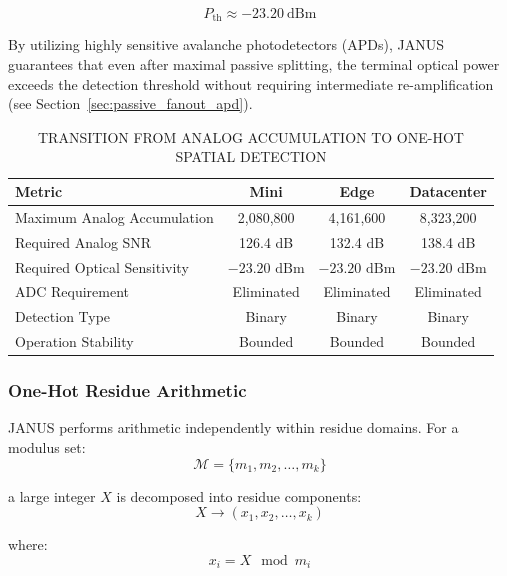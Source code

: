 \documentclass[journal]{IEEEtran}
\begin{document}
\begin{equation}
P_{\mathrm{th}} \approx -23.20~\mathrm{dBm}
\end{equation}

By utilizing highly sensitive avalanche photodetectors (APDs), JANUS guarantees that even after maximal passive splitting, the terminal optical power exceeds the detection threshold without requiring intermediate re-amplification (see Section~\ref{sec:passive_fanout_apd}).

\begin{table}[htbp]
\centering
\small
\setlength{\tabcolsep}{3pt}
\caption{TRANSITION FROM ANALOG ACCUMULATION TO ONE-HOT SPATIAL DETECTION}
\label{tab:onehot_transition}
\begin{tabular}{lccc}
\toprule
Metric & Mini & Edge & Datacenter \\
\midrule
Maximum Analog Accumulation & 2,080,800 & 4,161,600 & 8,323,200 \\
Required Analog SNR & 126.4 dB & 132.4 dB & 138.4 dB \\
Required Optical Sensitivity & $-23.20\text{ dBm}$ & $-23.20\text{ dBm}$ & $-23.20\text{ dBm}$ \\
ADC Requirement & Eliminated & Eliminated & Eliminated\\
Detection Type & Binary & Binary & Binary \\
Operation Stability & Bounded & Bounded & Bounded \\
\bottomrule
\end{tabular}
\end{table}

\subsubsection{\textbf{One-Hot Residue Arithmetic}}

 JANUS performs arithmetic independently within residue domains.
For a modulus set:
\begin{equation}
\mathcal{M} = \{m_1, m_2, \dots, m_k\}
\label{eq:modulus_set}
\end{equation}

a large integer $X$ is decomposed into residue components:
\begin{equation}
X \rightarrow (x_1, x_2, \dots, x_k)
\end{equation}

where:
\begin{equation}
x_i = X \mod m_i
\label{eq:residue_projection}
\end{equation}
\end{document}

